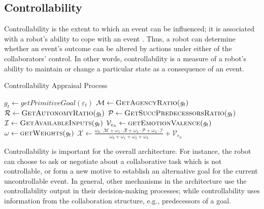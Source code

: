 \documentclass[12pt]{report}
\begin{document}
\subsection{Controllability}
\label{sec:controllability}
Controllability is the extent to which an event can be influenced; it is
associated with a robot's ability to cope with an event
\cite{gratch:domain-independent}. Thus, a robot can determine whether an event's
outcome can be altered by actions under either of the collaborators' control. In
other words, controllability is a measure of a robot's ability to maintain or
change a particular state as a consequence of an event.

\begin{algorithm}[t]
	\caption{Controllability Appraisal Process}
	\label{alg:controllability}
	\begin{algorithmic}[1]
 			\State $\mathit{g}_{t} \gets \textit{getPrimitiveGoal}{(\varepsilon_t)}$
  			\Statex
			\State $\mathcal{M} \gets \Call{GetAgencyRatio}{\mathit{g}_{t}}$ 
			\State $\mathcal{R} \gets \Call{GetAutonomyRatio}{\mathit{g}_{t}}$
 			\Statex
			\State $\mathcal{P} \gets \Call{GetSuccPredecessorsRatio}{\mathit{g}_{t}}$
			\State $\mathcal{I} \gets \Call{GetAvailableInputs}{\mathit{g}_{t}}$
  			\Statex
			\State $\mathcal{V}_{e_h} \gets \Call{getEmotionValence}{\mathit{g}_{t}}$ 
			\State $\omega \gets \Call{getWeights}{\mathit{g}_{t}}$
			\Statex
			\State $\mathcal{X} \gets
			\frac{\omega_{0}\cdot \mathcal{M} + \omega_{1}\cdot \mathcal{R} +
			\omega_{2}\cdot \mathcal{P} + \omega_{3}\cdot \mathcal{I}}{\omega_{0} +
			\omega_{1} + \omega_{2} + \omega_{3}} + \mathcal{V}_{e_h}$
  			\Statex
 			\Statex
 				\State {}
			\Else 
 				\State {}
			\EndIf
		\EndFunction
	\end{algorithmic}
\end{algorithm}

Controllability is important for the overall architecture. For instance, the
robot can choose to ask or negotiate about a collaborative task which is not
controllable, or form a new motive to establish an alternative goal for the
current uncontrollable event. In general, other mechanisms in the architecture
use the controllability output in their decision-making processes; while
controllability uses information from the collaboration structure, e.g.,
predecessors of a goal.
\end{document}
